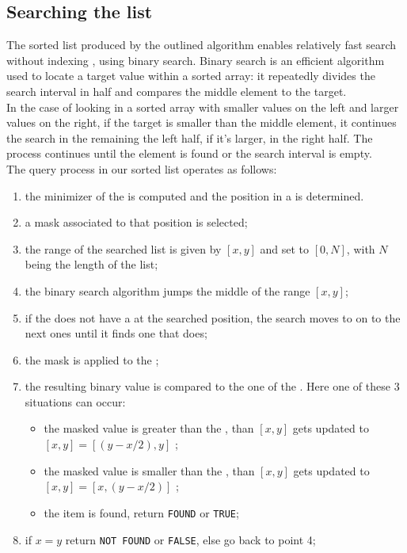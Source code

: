 \subsection{Searching the list}
The sorted \skmer list produced by the outlined algorithm enables relatively fast search without indexing \kmers, using binary search. Binary search is an efficient algorithm used to locate a target value within a sorted array: it repeatedly divides the search interval in half and compares the middle element to the target.\\
In the case of looking in a sorted array with smaller values on the left and larger values on the right, if the target is smaller than the middle element, it continues the search in the remaining the left half, if it's larger, in the right half. The process continues until the element is found or the search interval is empty.\\
The \kmer query process in our sorted \skmer list operates as follows:
\begin{enumerate}
	\item the minimizer of the \kmers is computed and the \kmer position in a \skmer is determined.
	\item a mask associated to that position is selected;
	\item the range of the searched list is given by $[x,y]$ and set to $[0,N]$, with $N$ being the length of the list;
	\item the binary search algorithm jumps the middle \skmer of the range $[x,y]$;
	\item if the \skmer does not have a \kmer at the searched position, the search moves to on to the next ones until it finds one that does;
	\item the mask is applied to the \skmer;
	\item the resulting binary value is compared to the one of the \kmer. Here one of these 3 situations can occur:
	\begin{itemize}
		\item the masked \skmer value is greater than the \kmer, than $[x,y]$ gets updated to $[x,y] = [(y-x/2),y]$ ;
		\item the masked \skmer value is smaller than the \kmer, than $[x,y]$ gets updated to $[x,y] = [x,(y-x/2)]$ ;
		\item the item is found, return \texttt{FOUND} or \texttt{TRUE};
	\end{itemize}
	\item if $x = y$ return \texttt{NOT FOUND} or \texttt{FALSE}, else go back to point 4;
\end{enumerate}

